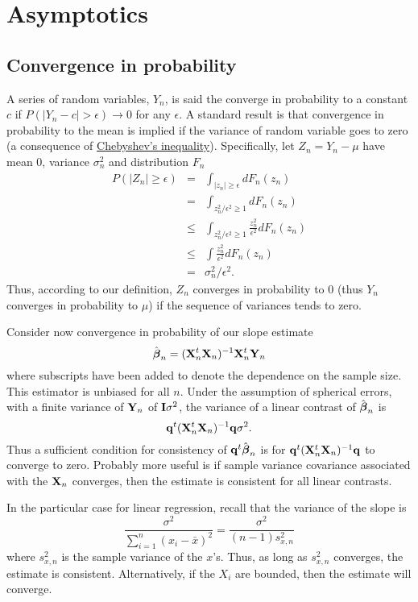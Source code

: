 \chapter{Asymptotics}

\section{Convergence in probability}
A series of random variables, $Y_n$, is said the converge in probability to 
a constant $c$ if $P( | Y_n - c| > \epsilon) \rightarrow 0$ for any $\epsilon$. 
A standard result is that convergence in probability to the mean is implied if the
variance of random variable goes to zero (a consequence of \href{https://en.wikipedia.org/wiki/Chebyshev%27s_inequality}{Chebyshev's inequality}).
Specifically, let $Z_n = Y_n - \mu$ have mean $0$, variance 
$\sigma^2_n$
and distribution $F_n$
\begin{eqnarray*}
P( |Z_n | \geq  \epsilon) & = & 
\int_{|z_n | \geq \epsilon} dF_n (z_n) \\
& =  & 
\int_{z_n^2 / \epsilon^2 \geq 1} dF_n (z_n) \\
& \leq & \int_{z_n^2 / \epsilon^2 \geq 1} \frac{z_n^2}{\epsilon^2} dF_n (z_n)\\
& \leq & \int \frac{z_n^2}{\epsilon^2} dF_n (z_n)\\
& = & \sigma^2_n / \epsilon^2.
\end{eqnarray*}
Thus, according to our definition, $Z_n$ converges in probability 
to 0 (thus $Y_n$ converges in probability to $\mu$) if the
sequence of variances tends to zero. 

Consider now convergence in probability of our slope estimate
$$
\hat {\boldsymbol{\beta}}_n = (\mathbf{X}_n^t \mathbf{X}_n)^{-1}\mathbf{X}_n^t  \mathbf{Y}_n
$$
where subscripts have been added to denote the dependence on the sample size.
This estimator is unbiased for all $n$.
Under the assumption of spherical errors, with a finite variance of $\mathbf{Y}_n$
of $\mathbf{I} \sigma^2$, the variance of a linear contrast of $\hat {\boldsymbol{\beta}}_n$ is
$$
\mathbf{q}^t (\mathbf{X}_n^t \mathbf{X}_n)^{-1} \mathbf{q} \sigma^2.
$$
Thus a sufficient condition for consistency of $\mathbf{q}^t \hat {\boldsymbol{\beta}}_n$ is 
for $\mathbf{q}^t (\mathbf{X}_n^t \mathbf{X}_n)^{-1} \mathbf{q}$ to converge to zero. Probably more
useful is if sample variance covariance associated with the $\mathbf{X}_n$ converges,
then the estimate is consistent for all linear contrasts.

In the particular case for linear regression, recall that the variance of the slope
is 
$$
\frac{\sigma^2}{\sum_{i=1}^n (x_{i} - \bar{x})^2} =
\frac{\sigma^2}{(n-1) s^2_{x,n}}
$$
where $s^2_{x,n}$ is the sample variance of the $x$'s. Thus, as long as
$s_{x,n}^2$ converges, the estimate is consistent. Alternatively,
if the $X_i$ are bounded, then the estimate will converge. 




